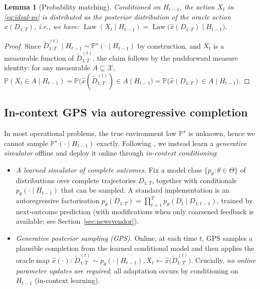 \documentclass[11pt]{article}
\newtheorem{lemma}{Lemma}
\renewcommand{\P}{\mathbb{P}}
\DeclareMathOperator{\Law}{Law}
\providecommand{\cX}{\mathcal{X}}
\begin{document}
\begin{lemma}[Probability matching]\label{lem:probmatching}
Conditioned on $H_{t-1}$, the action $X_t$ in \eqref{eq:ideal-ps} is distributed as
the posterior distribution of the oracle action $\hat x(D_{1:T})$, i.e., we have:
\(
\Law(X_t\mid H_{t-1}) = \Law\bigl(\hat x(D_{1:T})\mid H_{t-1}\bigr).
\)
\end{lemma}

\begin{proof}
Since $\widetilde D_{1:T}^{(t)}\mid H_{t-1} \sim \P^\star(\cdot\mid H_{t-1})$ by construction, and
$X_t$ is a measurable function of $\widetilde D_{1:T}^{(t)}$, the claim follows by the
pushforward measure identity: for any measurable $A\subseteq\cX$,
\(
\P(X_t\in A\mid H_{t-1})
=
\P\bigl(\hat x(\widetilde D_{1:T}^{(t)})\in A \mid H_{t-1}\bigr)
=
\P\bigl(\hat x(D_{1:T})\in A \mid H_{t-1}\bigr).
\)
\end{proof}

















\subsection{In-context GPS via autoregressive completion}
\label{subsec:gen-ps}

In most operational problems, the true environment law $\P^\star$ is unknown, hence we cannot sample
$\P^\star(\cdot\mid H_{t-1})$ exactly. Following \citet{cai2024active,zhang2025contextual}, we instead
learn a \emph{generative simulator} offline and deploy it online through \emph{in-context conditioning}:
\begin{itemize}
    \item \textit{A learned simulator of complete outcomes.}
    Fix a model class $\{p_\theta:\theta\in\Theta\}$ of distributions over complete trajectories $D_{1:T}$,
    together with conditionals $p_\theta(\cdot\mid H_{t-1})$ that can be sampled. A standard implementation is an autoregressive factorisation $p_\theta(D_{1:T}) = \prod_{t=1}^T p_\theta(D_t\mid D_{1:t-1})$, trained by next-outcome prediction (with modifications when only coarsened feedback is available;
    see Section~\ref{sec:newsvendor}).
    \item \textit{Generative posterior sampling (GPS).}
    Online, at each time $t$, GPS samples a plausible completion from the learned conditional model and
    then applies the oracle map $\hat x(\cdot)$: $\widetilde D_{1:T}^{(t)} \sim p_\theta(\cdot\mid H_{t-1}), X_t \gets \hat x\!\bigl(\widetilde D_{1:T}^{(t)}\bigr).$ Crucially, \emph{no online parameter updates are required}; all adaptation occurs by conditioning on
    $H_{t-1}$ (in-context learning).
\end{itemize}
\end{document}
